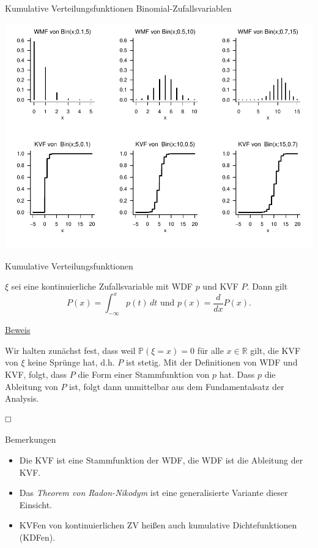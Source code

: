\documentclass[
  8pt,
  ignorenonframetext,
]{beamer}
\begin{document}
\begin{frame}{Kumulative Verteilungsfunktionen}
\protect\hypertarget{kumulative-verteilungsfunktionen-7}{}
Binomial-Zufallsvariablen \vspace{.2cm}

\begin{center}\includegraphics[width=0.8\linewidth]{4_Abbildungen/wtfi_4_binomialverteilung_kvf} \end{center}
\end{frame}

\begin{frame}{Kumulative Verteilungsfunktionen}
\protect\hypertarget{kumulative-verteilungsfunktionen-8}{}
\small
\begin{theorem}
\justifying
\normalfont
$\xi$ sei eine kontinuierliche Zufallsvariable mit WDF $p$ und KVF $P$. Dann gilt
\begin{equation}
P(x) = \int_{-\infty}^x p(t)\,dt
\mbox{ und }
p(x) = \frac{d}{dx}P(x).
\end{equation}
\end{theorem}

\footnotesize

\underline{Beweis} \vspace{1mm}

Wir halten zunächst fest, dass weil \(\mathbb{P}(\xi = x) = 0\) für alle
\(x \in \mathbb{R}\) gilt, die KVF von \(\xi\) keine Sprünge hat, d.h.
\(P\) ist stetig. Mit der Definitionen von WDF und KVF, folgt, dass
\(P\) die Form einer Stammfunktion von \(p\) hat. Dass \(p\) die
Ableitung von \(P\) ist, folgt dann unmittelbar aus dem Fundamentalsatz
der Analysis.

\(\hfill \Box\)

Bemerkungen

\begin{itemize}
\item Die KVF ist eine Stammfunktion der WDF, die WDF ist die Ableitung der KVF.
\item Das \textit{Theorem von Radon-Nikodym} ist eine generalisierte Variante dieser Einsicht.
\item KVFen von kontinuierlichen ZV heißen auch kumulative Dichtefunktionen (KDFen).
\end{itemize}
\end{frame}
\end{document}

